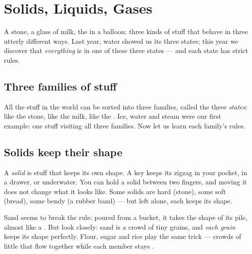\chapter{Solids, Liquids, Gases}\label{ch:g3:solids-liquids-gases}

A stone, a glass of milk, the  in a balloon: three kinds of stuff
that behave in three utterly different ways. Last year, water showed
us its three states; this year we discover that \emph{everything}
is in one of these three states --- and each state has strict
rules.

\section{Three families of stuff}

All the stuff in the world can be sorted into three families, called
the three \emph{states}:  like the stone,  like the milk,
 like the . Ice, water and steam were our first example: one
stuff visiting all three families. Now let us learn each family's
rules.

\section{Solids keep their shape}

\begin{definition}[Solid]\label{def:g3:solids-liquids-gases:solid}
A \emph{solid} is stuff that keeps its own shape. A key
keeps its zigzag in your pocket, in a drawer, or underwater. You can
hold a solid between two fingers, and moving it does not change what
it looks like. Some solids are hard (stone), some soft (bread), some
bendy (a rubber band) --- but left alone, each keeps its shape.
\end{definition}

\begin{example}\label{ex:g3:solids-liquids-gases:sand}
Sand seems to break the rule: poured from a bucket, it takes the
shape of its pile, almost like a . But look closely: sand is a
crowd of tiny  grains, and \emph{each grain} keeps its shape
perfectly. Flour, sugar and rice play the same trick --- crowds of
little  that flow together while each member stays .
\end{example}

